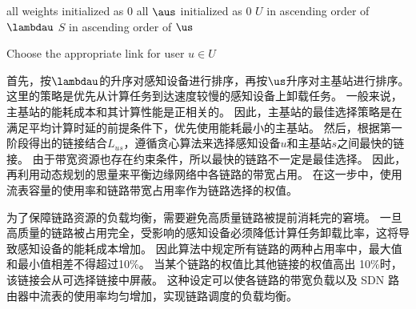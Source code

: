 \begin{algorithm}[h]
\setstretch{\algostretch}
all weights initialized as $0$
all $\aus$ initialized as $0$
$U$ in ascending order of $\lambdau$
$S$ in ascending order of $\us$
\KwOut{$\xusl$}
\caption{Choose the appropriate link for user $u \in U$}
\label{algo_findminpaths}
\end{algorithm}

首先，按$\lambdau$的升序对感知设备进行排序，再按$\us$升序对主基站进行排序。 这里的策略是优先从计算任务到达速度较慢的感知设备上卸载任务。
一般来说，主基站的能耗成本和其计算性能是正相关的。
因此，主基站的最佳选择策略是在满足平均计算时延的前提条件下，优先使用能耗最小的主基站。
然后，根据第一阶段得出的链接结合$L_{us}$，遵循贪心算法来选择感知设备$u$和主基站$s$之间最快的链接。 
由于带宽资源也存在约束条件，所以最快的链路不一定是最佳选择。
因此，再利用动态规划的思量来平衡边缘网络中各链路的带宽占用。
在这一步中，使用流表容量的使用率和链路带宽占用率作为链路选择的权值。

为了保障链路资源的负载均衡，需要避免高质量链路被提前消耗完的窘境。
一旦高质量的链路被占用完全，受影响的感知设备必须降低计算任务卸载比率，这将导致感知设备的能耗成本增加。
因此算法中规定所有链路的两种占用率中，最大值和最小值相差不得超过10\%。
当某个链路的权值比其他链接的权值高出 10\%时，该链接会从可选择链接中屏蔽。
这种设定可以使各链路的带宽负载以及 SDN 路由器中流表的使用率均匀增加，实现链路调度的负载均衡。



